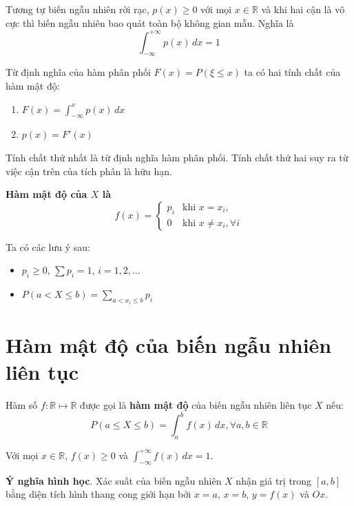 \documentclass{mynotes}
\newcommand{\RR}{\mathbb{R}}
\begin{document}
Tương tự biến ngẫu nhiên rời rạc, $p(x) \geq 0$ với mọi $x \in \RR$ và khi hai cận là vô cực thì biến ngẫu nhiên bao quát toàn bộ không gian mẫu. Nghĩa là \[ \int_{-\infty}^{+\infty} p(x)\, dx = 1 \]

Từ định nghĩa của hàm phân phối $F(x) = P(\xi \leq x)$ ta có hai tính chất của hàm mật độ:

\begin{enumerate}
    \item $\displaystyle{F(x) = \int_{-\infty}^{x} p(x)\, dx}$
    \item $p(x) = F'(x)$
\end{enumerate}

Tính chất thứ nhất là từ định nghĩa hàm phân phối. Tính chất thứ hai suy ra từ việc cận trên của tích phân là hữu hạn.

\textbf{Hàm mật độ của $X$ là} \[f(x) = \begin{cases}
        p_i & \text{khi } x = x_i, \\
        0 & \text{khi } x \neq x_i, \forall i
\end{cases}\]

\begin{remark}
    Ta có các lưu ý sau:
    \begin{itemize}
        \item $p_i \geq 0$, $\sum p_i = 1$, $i = 1, 2, \ldots$
    
        \item $\displaystyle{P(a < X \leq b) = \sum_{a < x_i \leq b} p_i}$
    \end{itemize}
\end{remark}

\section{Hàm mật độ của biến ngẫu nhiên liên tục}

\begin{definition}
    Hàm số $f: \mathbb{R} \mapsto \mathbb{R}$ được gọi là \textbf{hàm mật độ} của biến ngẫu nhiên liên tục $X$ nếu: \[P(a \leq X \leq b) = \displaystyle{\int_a^b f(x)\,dx}, \forall a, b \in \mathbb{R}\]
\end{definition}

\begin{remark}
    Với mọi $x \in \mathbb{R}$, $f(x) \geq 0$ và $\displaystyle{\int_{-\infty}^{+\infty}f(x)\,dx = 1}$.
\end{remark}

\textbf{Ý nghĩa hình học}. Xác suất của biến ngẫu nhiên $X$ nhận giá trị trong $[a, b]$ bằng diện tích hình thang cong giới hạn bởi $x=a$, $x=b$, $y=f(x)$ và $Ox$.
\end{document}
